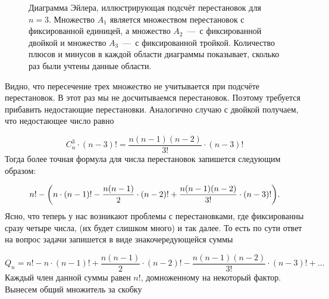 \documentclass[12pt]{article}
\begin{document}
\begin{figure}[htbp]
	\centering
	\caption{Диаграмма Эйлера, иллюстрирующая подсчёт перестановок для $n=3$. Множество $A_1$ является множеством перестановок с фиксированной единицей, а множество $A_2$~\----~с фиксированной двойкой и множество $A_3$~\----~с фиксированной тройкой. Количество плюсов и минусов в каждой области диаграммы показывает, сколько раз были учтены данные области.}
	\label{fig:figure2}
\end{figure}
Видно, что пересечение трех множество не учитывается при подсчёте перестановок. В этот раз мы не досчитываемся перестановок. Поэтому требуется прибавить недостающие перестановки. Аналогично случаю с двойкой получаем, что недостающее число равно

\begin{equation}
	C_n^3 \cdot (n-3)! = \dfrac{n (n-1) (n-2)}{3!} \cdot (n-3)!
\end{equation}
Тогда более точная формула для числа перестановок запишется следующим образом:

\begin{equation}
	n! - \qty(n\cdot(n-1)! - \dfrac{n (n-1)}{2}\cdot (n-2)! + \dfrac{n (n-1) (n-2)}{3!} \cdot (n-3)!).
\end{equation}
Ясно, что теперь у нас возникают проблемы с перестановками, где фиксированны сразу четыре числа, (их  будет слишком много) и так далее. То есть по сути ответ на вопрос задачи запишется в виде знакочередующейся суммы

\begin{equation}
	Q_n = n! - n\cdot(n-1)! + \dfrac{n (n-1)}{2}\cdot (n-2)! - \dfrac{n (n-1) (n-2)}{3!} \cdot (n-3)! + \ldots
\end{equation}
Каждый член данной суммы равен $n!$, домноженному на некоторый фактор. Вынесем общий множитель за скобку
\end{document}
